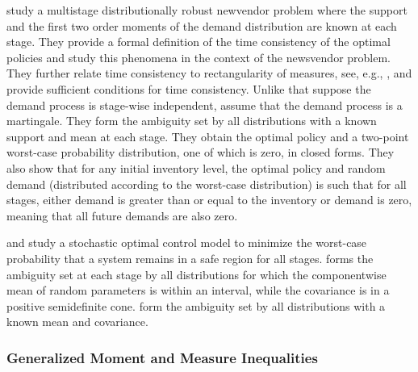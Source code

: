 \documentclass[final,onefignum,onetabnum]{class}
\begin{document}
\citet{xin2018moment} study a multistage distributionally robust newvendor problem where the support and the first two order moments of the demand distribution are known at each stage. They provide a formal definition of the time consistency of  the optimal policies and study this  phenomena in the context of the newsvendor problem. They further relate time consistency to rectangularity of measures, see, e.g., \citet{shapiro2016rectangular}, and provide sufficient conditions for time consistency. 
Unlike \citet{xin2018moment} that suppose  the demand process is stage-wise independent, \citet{xin2018martingle} assume  that the demand process is a martingale. 
They form the ambiguity set by all distributions with a known support and mean  at each stage. They obtain the optimal policy and a two-point worst-case probability distribution, one of which is zero,  in closed forms. They also show that for any initial inventory level, the optimal policy and random demand (distributed according to the worst-case distribution) is such that for all stages, either demand is greater than or equal to the inventory  or demand is zero, meaning that all future demands are also zero. 

\citet{yang2018game} and \citet{vanparys2016constrained} study a stochastic optimal control model to minimize the worst-case probability that a system remains in a safe region for all stages. \citet{yang2018game} forms the ambiguity set at each stage by all distributions for which the  componentwise mean of random parameters is within an interval, while the covariance is in a positive semidefinite cone. \citet{vanparys2016constrained} form the ambiguity set by all distributions with a known mean and covariance. 
 




\subsubsection{Generalized Moment and Measure Inequalities}
\label{sec: rev. measure_marginal_moments}
\end{document}
